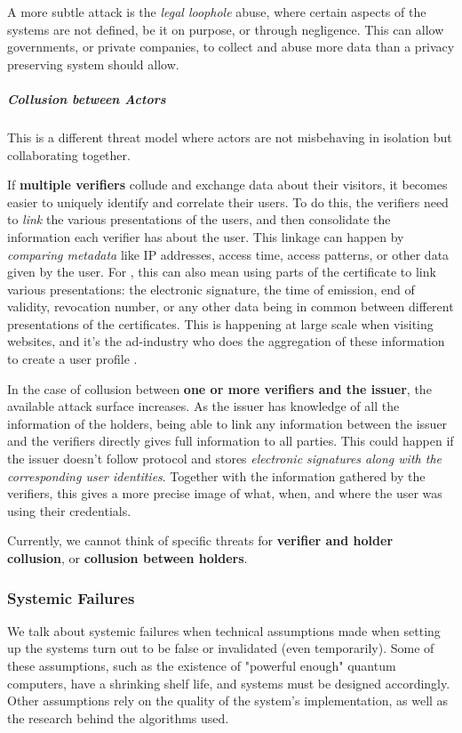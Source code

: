 A more subtle attack is the \emph{legal loophole} abuse, where certain aspects of the systems
are not defined, be it on purpose, or through negligence.
This can allow governments, or private companies, to collect and abuse
more data than a privacy preserving system should allow.

\subparagraph{Collusion between Actors}

This is a different threat model where actors are not misbehaving in isolation but collaborating together.

If \textbf{multiple verifiers} collude and exchange data about their visitors,
it becomes easier to uniquely identify and correlate their users.
To do this, the verifiers need to \emph{link} the various presentations of the users,
and then consolidate the information each verifier has about the user.
This linkage can happen by \emph{comparing metadata} like IP addresses, access
time, access patterns, or other data given by the user.
For \eid, this can also mean using parts of the certificate to link various presentations:
 the electronic signature, the time of emission, end of validity, revocation number,
or any other data being in common between different presentations of the certificates.
This is happening at large scale when visiting websites, and it's the ad-industry who
does the aggregation of these information to create a user profile \cite{BARW16}.

In the case of collusion between \textbf{one or more verifiers and the issuer},
the available attack surface increases.
As the issuer has knowledge of all the information of the holders, being able to
link any information between the issuer and the verifiers directly gives full
information to all parties.
This could happen if the issuer doesn't follow protocol and stores
\emph{electronic signatures along with the corresponding user identities}.
Together with the information gathered by the verifiers, this gives a more precise
image of what, when, and where the user was using their credentials.

Currently, we cannot think of specific threats for \textbf{verifier and holder collusion},
or \textbf{collusion between holders}.

\subsubsection{Systemic Failures}

We talk about systemic failures when technical assumptions made when setting up the systems turn out to be false or invalidated (even temporarily).
Some of these assumptions, such as the existence of "powerful enough" quantum computers, have a shrinking shelf life, and systems must be designed accordingly.
Other assumptions rely on the quality of the system's implementation, as well as
the research behind the algorithms used.

